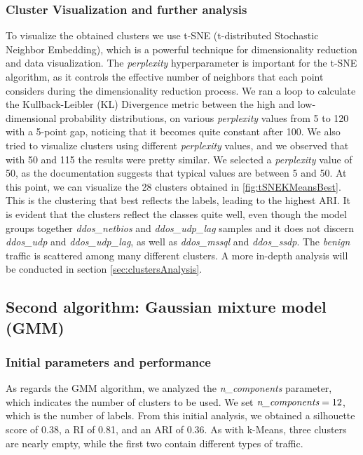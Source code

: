 \documentclass[acmlarge,nonacm]{acmart}
\begin{document}
\subsubsection{Cluster Visualization and further analysis}
To visualize the obtained clusters we use t-SNE (t-distributed Stochastic Neighbor Embedding), which is a powerful technique for dimensionality reduction and data visualization. 
The \emph{perplexity} hyperparameter is important for the t-SNE algorithm, as it controls the effective number of neighbors that each point considers during the dimensionality reduction process. 
We ran a loop to calculate the Kullback-Leibler (KL) Divergence metric between the high and low-dimensional probability distributions, on various \emph{perplexity} values from 5 to 120 with a 5-point gap, noticing that it becomes quite constant after 100. We also tried to visualize clusters using different \emph{perplexity} values, and we observed that with 50 and 115 the results were pretty similar. We selected a \emph{perplexity} value of 50, as the documentation suggests that typical values are between 5 and 50. At this point, we can visualize the 28 clusters obtained in \cref{fig:tSNEKMeansBest}. This is the clustering that best reflects the labels, leading to the highest ARI. It is evident that the clusters reflect the classes quite well, even though the model groups together \emph{ddos\_netbios} and \emph{ddos\_udp\_lag} samples and it does not discern \emph{ddos\_udp} and \emph{ddos\_udp\_lag}, as well as \emph{ddos\_mssql} and \emph{ddos\_ssdp}. The \emph{benign} traffic is scattered among many different clusters. A more in-depth analysis will be conducted in section \cref{sec:clustersAnalysis}.

\subsection{Second algorithm: Gaussian mixture model (GMM)}
\subsubsection{Initial parameters and performance}
As regards the GMM algorithm, we analyzed the \emph{n\_components} parameter, which indicates the number of clusters to be used.  We set $\emph{n\_components}=12$, which is the number of labels. From this initial analysis, we obtained a silhouette score of 0.38, a RI of 0.81, and an ARI of 0.36. As with k-Means, three clusters are nearly empty, while the first two contain different types of traffic.
\end{document}
